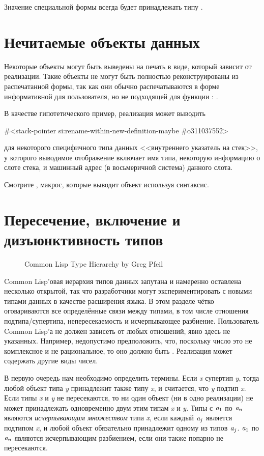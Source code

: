 Значение специальной формы  всегда будет принадлежать типу .

\section{Нечитаемые объекты данных}

Некоторые объекты могут быть выведены на печать в виде, который зависит от
реализации.
Такие объекты не могут быть полностью реконструированы из распечатанной формы,
так как они обычно распечатываются в форме информативной для пользователя, но не
подходящей для функции :
.

В качестве гипотетического пример, реализация может выводить 
\begin{lisp}
\#<stack-pointer si:rename-within-new-definition-maybe \#o311037552>
\end{lisp}
для некоторого специфичного типа данных <<внутреннего указатель на стек>>, у
которого выводимое отображение включает имя типа, некоторую информацию о слоте
стека, и машинный адрес (в восьмеричной система) данного слота.

Смотрите , макрос, которые выводит объект используя
\cd{\#<} синтаксис.

\section{Пересечение, включение и дизъюнктивность типов}
\label{DATA-TYPE-RELATIONSHIPS}

\begin{figure}
\caption{Common Lisp Type Hierarchy by Greg Pfeil}
\label{TYPES-HEIRARCHY-GRAPHIC}
\small\noindent
\end{figure}


Common Lisp'овая иерархия типов данных запутана и намеренно оставлена несколько
открытой, так что разработчики могут экспериментировать с новыми типами данных в
качестве расширения языка. В этом разделе чётко оговариваются все
определённые связи между типами, в том числе отношения подтипа/супертипа,
непересекаемость и исчерпывающее разбиение. Пользователь Common Lisp'а
не должен зависеть от любых отношений, явно здесь не указанных.
Например, недопустимо предположить, что, поскольку число
это не комплексное и не рациональное, то оно должно быть . Реализация
может содержать другие виды чисел.

В первую очередь нам необходимо определить термины.
Если \emph{x} супертип \emph{y}, тогда любой объект типа \emph{y} принадлежит
также типу \emph{x}, и считается, что \emph{y} подтип \emph{x}. Если типы
\emph{x} и \emph{y} не пересекаются, то ни один объект (ни в одно реализации) не
может принадлежать одновременно двум этим типам \emph{x} и \emph{y}. Типы
с $\emph{a}_1$ по $\emph{a}_{n}$ являются \emph{исчерпывающим множеством} типа
\emph{x}, если каждый $\emph{a}_j$ является подтипом \emph{x}, и любой объект
обязательно принадлежит одному из типов $\emph{a}_{j}$.
$\emph{a}_1$ по $\emph{a}_{n}$ являются исчерпывающим разбиением, если они также
попарно не пересекаются.

